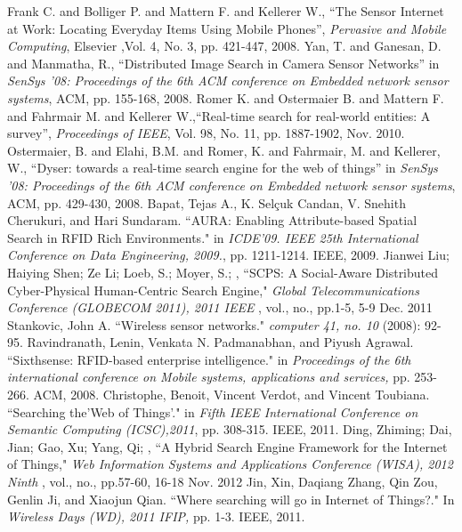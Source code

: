 \documentclass [a4paper,12pt]{book}
\begin{document}
\begin{thebibliography}{1000}
Frank C. and Bolliger P. and Mattern F. and Kellerer W., ``The Sensor Internet at Work: Locating Everyday Items Using Mobile Phones'', {\em Pervasive and Mobile Computing}, Elsevier ,Vol. 4, No. 3, pp. 421-447, 2008.
Yan, T. and Ganesan, D. and Manmatha, R., ``Distributed Image Search in Camera Sensor Networks'' in {\em SenSys '08: Proceedings of the 6th ACM conference on Embedded network sensor systems}, ACM, pp. 155-168, 2008.
Romer K. and Ostermaier B. and Mattern F. and Fahrmair M. and Kellerer W.,``Real-time search for real-world entities: A survey'', {\em Proceedings of IEEE}, Vol. 98, No. 11, pp. 1887-1902, Nov. 2010. 
Ostermaier, B. and Elahi, B.M. and Romer, K. and Fahrmair, M. and Kellerer, W., ``Dyser: towards a real-time search engine for the web of things'' in {\em SenSys '08: Proceedings of the 6th ACM conference on Embedded network sensor systems}, ACM, pp. 429-430, 2008.
Bapat, Tejas A., K. Selçuk Candan, V. Snehith Cherukuri, and Hari Sundaram. ``AURA: Enabling Attribute-based Spatial Search in RFID Rich Environments." in {\em ICDE'09. IEEE 25th International Conference on Data Engineering, 2009.}, pp. 1211-1214. IEEE, 2009.
Jianwei Liu; Haiying Shen; Ze Li; Loeb, S.; Moyer, S.; , ``SCPS: A Social-Aware Distributed Cyber-Physical Human-Centric Search Engine," {\em Global Telecommunications Conference (GLOBECOM 2011), 2011 IEEE} , vol., no., pp.1-5, 5-9 Dec. 2011
Stankovic, John A. ``Wireless sensor networks." {\em computer 41, no. 10} (2008): 92-95.
Ravindranath, Lenin, Venkata N. Padmanabhan, and Piyush Agrawal. ``Sixthsense: RFID-based enterprise intelligence." in {\em Proceedings of the 6th international conference on Mobile systems, applications and services,} pp. 253-266. ACM, 2008.
Christophe, Benoit, Vincent Verdot, and Vincent Toubiana. ``Searching the'Web of
Things'." in {\em Fifth IEEE International Conference on Semantic Computing (ICSC),2011}, pp. 308-315. IEEE, 2011.
Ding, Zhiming; Dai, Jian; Gao, Xu; Yang, Qi; , ``A Hybrid Search Engine Framework for the Internet of Things," {\em Web Information Systems and Applications Conference (WISA), 2012 Ninth} , vol., no., pp.57-60, 16-18 Nov. 2012
Jin, Xin, Daqiang Zhang, Qin Zou, Genlin Ji, and Xiaojun Qian. ``Where searching will go in Internet of Things?." In {\em Wireless Days (WD), 2011 IFIP,} pp. 1-3. IEEE, 2011.


\end{thebibliography}
\end{document}
